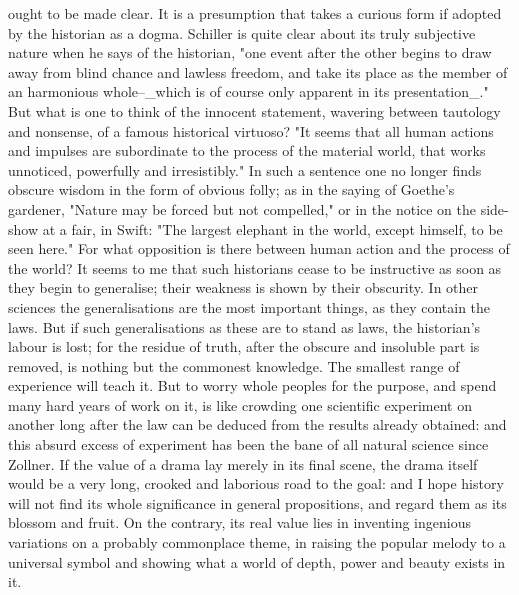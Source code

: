 ought to be made clear. It is a presumption that takes a curious form
if adopted by the historian as a dogma. Schiller is quite clear about
its truly subjective nature when he says of the historian, "one event
after the other begins to draw away from blind chance and lawless
freedom, and take its place as the member of an harmonious
whole--_which is of course only apparent in its presentation_." But
what is one to think of the innocent statement, wavering between
tautology and nonsense, of a famous historical virtuoso? "It seems
that all human actions and impulses are subordinate to the process of
the material world, that works unnoticed, powerfully and
irresistibly." In such a sentence one no longer finds obscure wisdom
in the form of obvious folly; as in the saying of Goethe's gardener,
"Nature may be forced but not compelled," or in the notice on the
side-show at a fair, in Swift: "The largest elephant in the world,
except himself, to be seen here." For what opposition is there
between human action and the process of the world? It seems to me
that such historians cease to be instructive as soon as they begin to
generalise; their weakness is shown by their obscurity. In other
sciences the generalisations are the most important things, as they
contain the laws. But if such generalisations as these are to stand
as laws, the historian's labour is lost; for the residue of truth,
after the obscure and insoluble part is removed, is nothing but the
commonest knowledge. The smallest range of experience will teach it.
But to worry whole peoples for the purpose, and spend many hard years
of work on it, is like crowding one scientific experiment on another
long after the law can be deduced from the results already obtained:
and this absurd excess of experiment has been the bane of all natural
science since Zollner. If the value of a drama lay merely in its
final scene, the drama itself would be a very long, crooked and
laborious road to the goal: and I hope history will not find its
whole significance in general propositions, and regard them as its
blossom and fruit. On the contrary, its real value lies in inventing
ingenious variations on a probably commonplace theme, in raising the
popular melody to a universal symbol and showing what a world of
depth, power and beauty exists in it.


